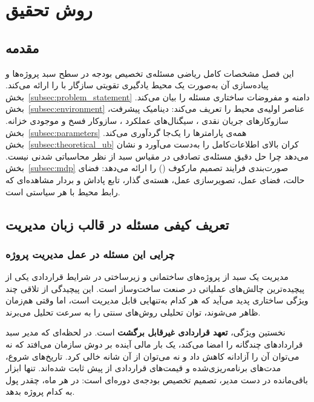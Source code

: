 \chapter{روش تحقیق}
\label{chap:problem}

\section{مقدمه}

این فصل مشخصات کامل ریاضی مسئله‌ی تخصیص بودجه در سطح سبد پروژه‌ها و
پیاده‌سازی آن به‌صورت یک محیط یادگیری تقویتی سازگار با 
را ارائه می‌کند. بخش~\ref{subsec:problem_statement} دامنه و مفروضات
ساختاری مسئله را بیان می‌کند. بخش~\ref{subsec:environment} عناصر اولیه‌ی
محیط را تعریف می‌کند: دینامیک پیشرفت، سازوکارهای جریان نقدی
، سیگنال‌های عملکرد ، سازوکار فسخ و موجودی خزانه.
بخش~\ref{subsec:parameters} همه‌ی پارامترها را یک‌جا گردآوری می‌کند.
بخش~\ref{subsec:theoretical_ub} کران بالای اطلاعات‌کامل را به‌دست
می‌آورد و نشان می‌دهد چرا حل دقیق مسئله‌ی تصادفی در مقیاس سبد از نظر
محاسباتی شدنی نیست. بخش~\ref{subsec:mdp} صورت‌بندی فرایند تصمیم مارکوف
() را ارائه می‌دهد: فضای حالت، فضای عمل، تصویرسازی عمل، هسته‌ی
گذار، تابع پاداش و بردار مشاهده‌ای که رابط محیط با هر سیاستی است.

\section{تعریف کیفی مسئله در قالب زبان مدیریت}
\label{sec:qualitative_problem}

\subsection{چرایی این مسئله در عمل مدیریت پروژه}

مدیریت یک سبد از پروژه‌های ساختمانی و زیرساختی در شرایط قراردادی
 یکی از
پیچیده‌ترین چالش‌های عملیاتی در صنعت ساخت‌وساز است. این پیچیدگی از
تلاقی چند ویژگی ساختاری پدید می‌آید که هر کدام به‌تنهایی قابل مدیریت
است، اما وقتی هم‌زمان ظاهر می‌شوند، توان تحلیلی روش‌های سنتی را به
سرعت تحلیل می‌برند.

نخستین ویژگی، \textbf{تعهد قراردادی غیرقابل برگشت} است. در لحظه‌ای که
مدیر سبد قراردادهای چندگانه را امضا می‌کند، یک بار مالی آینده بر دوش
سازمان می‌افتد که نه می‌توان آن را آزادانه کاهش داد و نه می‌توان از آن
شانه خالی کرد. تاریخ‌های شروع، مدت‌های برنامه‌ریزی‌شده و قیمت‌های
قراردادی از پیش ثابت شده‌اند. تنها ابزار باقی‌مانده در دست مدیر، تصمیم
تخصیص بودجه‌ی دوره‌ای است: در هر ماه، چقدر پول به کدام پروژه بدهد.

